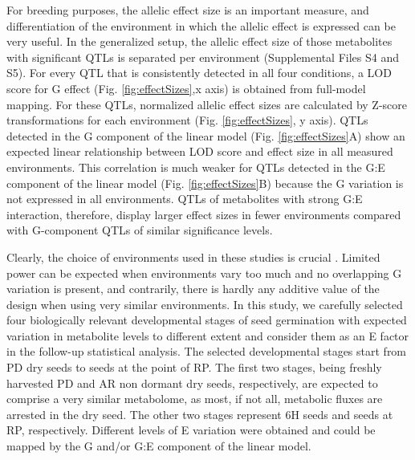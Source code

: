 For breeding purposes, the allelic effect size is an important measure, and differentiation of the 
environment in which the allelic effect is expressed can be very useful. In the generalized setup, 
the allelic effect size of those metabolites with significant QTLs is separated per environment 
(Supplemental Files S4 and S5). For every QTL that is consistently detected in all four conditions, 
a LOD score for G effect (Fig. \ref{fig:effectSizes},x axis) is obtained from full-model mapping. For these QTLs,
normalized allelic effect sizes are calculated by Z-score transformations for each environment 
(Fig. \ref{fig:effectSizes}, y axis). QTLs detected in the G component of the linear model (Fig. \ref{fig:effectSizes}A) show an expected 
linear relationship between LOD score and effect size in all measured environments. This correlation 
is much weaker for QTLs detected in the G:E component of the linear model (Fig. \ref{fig:effectSizes}B) because the G 
variation is not expressed in all environments. QTLs of metabolites with strong G:E interaction, 
therefore, display larger effect sizes in fewer environments compared with G-component QTLs of 
similar significance levels.

Clearly, the choice of environments used in these studies is crucial \cite{Li:2008}. Limited power 
can be expected when environments vary too much and no overlapping G variation is present, and 
contrarily, there is hardly any additive value of the design when using very similar environments. 
In this study, we carefully selected four biologically relevant developmental stages of seed germination 
with expected variation in metabolite levels to different extent and consider them as an E factor in 
the follow-up statistical analysis. The selected developmental stages start from PD dry seeds to 
seeds at the point of RP. The first two stages, being freshly harvested PD and AR non dormant dry 
seeds, respectively, are expected to comprise a very similar metabolome, as most, if not all, metabolic
fluxes are arrested in the dry seed. The other two stages represent 6H seeds and seeds at RP, respectively.
Different levels of E variation were obtained and could be mapped by the G and/or G:E component of 
the linear model.

